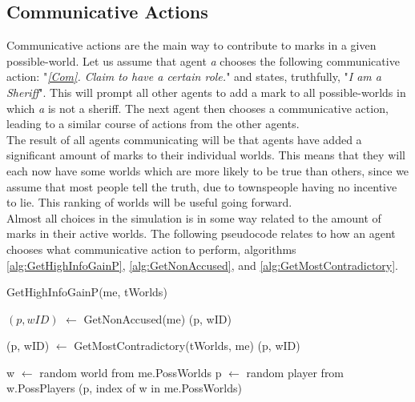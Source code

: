 \subsection{Communicative Actions}\label{CommunicativeActions}
Communicative actions are the main way to contribute to marks in a given
possible-world. Let us assume that agent \textit{a} chooses the following
communicative action: "\textit{\ref{Com}. Claim to have a certain role.}" and
states, truthfully, "\textit{I am a Sheriff}". This will prompt all other
agents to add a mark to all possible-worlds in which \textit{a} is not a
sheriff. The next agent then chooses a communicative action, leading to a
similar course of actions from the other agents. \\ The result of all agents
communicating will be that agents have added a significant amount of marks to
their individual worlds. This means that they will each now have some worlds
which are more likely to be true than others, since we assume that most people
tell the truth, due to townspeople having no incentive to lie. This ranking of
worlds will be useful going forward.\\ Almost all choices in the simulation is
in some way related to the amount of marks in their active worlds. The
following pseudocode relates to how an agent chooses what communicative action
to perform, algorithms \ref{alg:GetHighInfoGainP}, \ref{alg:GetNonAccused}, and
\ref{alg:GetMostContradictory}.
\begin{algorithm}[H]
	\caption{GetHighInfoGainP(me, tWorlds)}
	\begin{algorithmic}
		\State $(p, wID)$ $\gets$ GetNonAccused(me)
		\State \Return (p, wID)
		\EndIf
		\EndIf

		\State (p, wID) $\gets$ GetMostContradictory(tWorlds, me)
		\State \Return (p, wID)
		\EndIf

		\State w $\gets$ random world from me.PossWorlds
		\State p $\gets$ random player from w.PossPlayers
		\State \Return (p, index of w in me.PossWorlds)
		\label{alg:GetHighInfoGainP}
	\end{algorithmic}
\end{algorithm}
\vspace{-30px}
\setcounter{algorithmcaption}{0}
